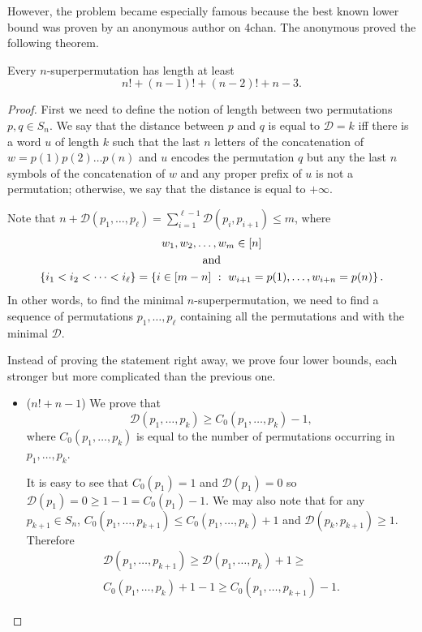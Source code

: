 However, the problem became especially famous because the best known lower bound
was proven by an anonymous author on 4chan. The anonymous proved the following
theorem.
\begin{theorem}
  Every $n$-superpermutation has length at least
  \[
    n! + (n - 1)! + (n - 2)! + n - 3.
  \]
\end{theorem}
\begin{proof}
  First we need to define the notion of length between two permutations
  $p, q \in S_n$. We say that the distance between $p$ and $q$ is equal to
  $\mathcal{D} = k$
  iff there is a word $u$ of length $k$ such that the last $n$ letters of the
  concatenation of  $w = p(1) p(2) \dots p(n)$ and $u$ encodes the permutation
  $q$ but any the last $n$ symbols of the concatenation of $w$ and any proper
  prefix of $u$ is not a permutation; otherwise, we say that the distance is
  equal to $+\infty$.

  Note that $n + \mathcal{D}(p_1, \dots, p_\ell) =
  \sum_{i = 1}^{\ell - 1} \mathcal{D}(p_i, p_{i + 1}) \le m$, where
  \begin{gather*}
    w_1, w_2, \dots, w_m \in [n] \\
    \text{and} \\
    \set{i_1 < i_2 < \dots < i_\ell} =
    \set[{
      w_{i + 1} = p(1), \dots, w_{i + n} = p(n)
    }]{
      i \in [m - n]
    }.
  \end{gather*}
  In other words, to find the minimal $n$-superpermutation, we need to find
  a sequence of permutations $p_1, \dots, p_\ell$ containing all the permutations
  and with the minimal $\mathcal{D}$.

  Instead of proving the statement right away, we prove four lower bounds, each
  stronger but more complicated than the previous one.

  \begin{itemize}
    \item ($n! + n - 1$) We prove that
      \begin{equation}
        \label{equation:inequality-1}
        \mathcal{D}(p_1, \dots, p_k) \ge
        C_0(p_1, \dots, p_k) - 1,
      \end{equation}
      where $C_0(p_1, \dots, p_k)$ is equal to
      the number of permutations occurring in $p_1, \dots, p_k$.

      It is easy to see that $C_0(p_1) = 1$ and $\mathcal{D}(p_1) = 0$ so
      $\mathcal{D}(p_1) = 0 \ge 1 - 1 = C_0(p_1) - 1$. We may also
      note that for any $p_{k + 1} \in S_n$,
      $C_0(p_1, \dots, p_{k + 1}) \le C_0(p_1, \dots, p_k) + 1$ and
      $\mathcal{D}(p_k, p_{k + 1}) \ge 1$. Therefore
      \begin{multline*}
        \mathcal{D}(p_1, \dots, p_{k + 1}) \ge
        \mathcal{D}(p_1, \dots, p_k) + 1 \ge \\
        C_0(p_1, \dots, p_k) + 1 - 1 \ge
        C_0(p_1, \dots, p_{k + 1}) - 1.
      \end{multline*}


\end{itemize}
\end{proof}
